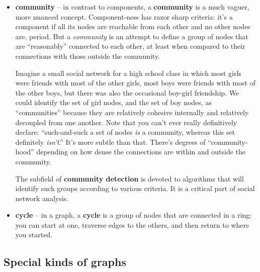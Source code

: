 \begin{itemize}
\item \textbf{community} -- in contrast to components, a \textbf{community} is
a much vaguer, more nuanced concept. Component-ness has razor sharp criteria:
it's a component if all its nodes are reachable from each other and no other
nodes are, period. But a \textit{community} is an attempt to define a group of
nodes that are ``reasonably'' connected to each other, at least when compared
to their connections with those outside the community.

Imagine a small social network for a high school class in which most girls
were friends with most of the other girls, most boys were friends with most of
the other boys, but there was also the occasional boy-girl friendship. We
could identify the set of girl nodes, and the set of boy nodes, as
``communities'' because they are relatively cohesive internally and relatively
decoupled from one another. Note that you can't ever really definitively
declare: ``such-and-such a set of nodes \textit{is} a community, whereas this
set definitely \textit{isn't}.'' It's more subtle than that. There's degrees of
``community-hood'' depending on how dense the connections are within and
outside the community.

The subfield of \textbf{community detection} is devoted to algorithms that
will identify such groups according to various criteria. It is a critical part
of social network analysis.

\item \textbf{cycle} -- in a graph, a \textbf{cycle} is a group of nodes that
are connected in a ring: you can start at one, traverse edges to the others,
and then return to where you started.

\end{itemize}

\subsection{Special kinds of graphs}

